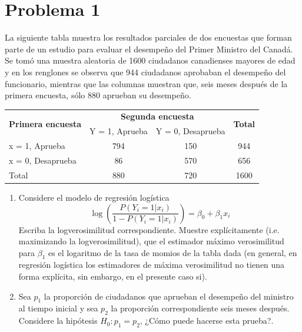
\section*{Problema \textcolor{CIMATRed}{1}}

La siguiente tabla muestra los resultados parciales de dos encuestas que forman parte de un estudio para evaluar el desempeño del Primer Ministro del Canadá. Se tomó una muestra aleatoria de 1600 ciudadanos canadienses mayores de edad y en los renglones se observa que 944 ciudadanos aprobaban el desempeño del funcionario, mientras que las columnas muestran que, seis meses después de la primera encuesta, sólo 880 aprueban su desempeño.

\begin{center}
    \begin{tabular}{|l|c|c|c|}
    \hline
    \multirow{2}{*}{\textbf{Primera encuesta}} & \multicolumn{2}{c|}{\textbf{Segunda encuesta}} & \multirow{2}{*}{\textbf{Total}} \\ \cline{2-3} 
                           & Y = 1, Aprueba      & Y = 0, Desaprueba      &                                  \\ \hline
    x = 1, Aprueba                             & 794                 & 150                    & 944                              \\ \hline
    x = 0, Desaprueba                          & 86                  & 570                    & 656                              \\ \hline
    Total                                      & 880                 & 720                    & 1600                             \\ \hline
    \end{tabular}
\end{center}

\begin{enumerate}[label=\alph*)]
    \item Considere el modelo de regresión logística
    \[
    \log\left(\frac{P(Y_i = 1|x_i)}{1 - P(Y_i = 1|x_i)}\right) = \beta_0 + \beta_1 x_i
    \]
    Escriba la logverosimilitud correspondiente. Muestre explícitamente (i.e. maximizando la logverosimilitud), que el estimador máximo verosimilitud para $\beta_1$ es el logaritmo de la tasa de momios de la tabla dada (en general, en regresión logística los estimadores de máxima verosimilitud no tienen una forma explícita, sin embargo, en el presente caso si).

    \item Sea $p_1$ la proporción de ciudadanos que aprueban el desempeño del ministro al tiempo inicial y sea $p_2$ la proporción correspondiente seis meses después. Considere la hipótesis $H_0: p_1 = p_2$, ¿Cómo puede hacerse esta prueba?.
\end{enumerate}

